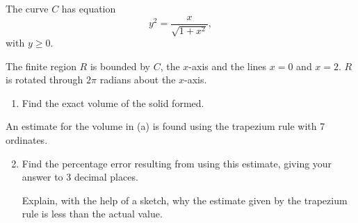 \begin{problem}
    The curve $C$ has equation \[y^2 = \frac{x}{\sqrt{1 + x^2}},\] with $y \geq 0$.

    The finite region $R$ is bounded by $C$, the $x$-axis and the lines $x = 0$ and $x = 2$. $R$ is rotated through $2\pi$ radians about the $x$-axis.

    \begin{enumerate}
        \item Find the exact volume of the solid formed.
    \end{enumerate}

    An estimate for the volume in (a) is found using the trapezium rule with 7 ordinates.

    \begin{enumerate}
        \setcounter{enumi}{1}
        \item Find the percentage error resulting from using this estimate, giving your answer to 3 decimal places.

        Explain, with the help of a sketch, why the estimate given by the trapezium rule is less than the actual value.
    \end{enumerate}
\end{problem}
